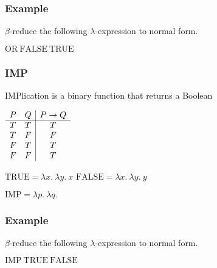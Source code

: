 \documentclass{beamer}
\begin{document}
\begin{frame}
	\frametitle{Example}

	$\beta$-reduce the following $\lambda$-expression to normal form.

	\vspace{0.5cm}

	$\text{OR} \ \text{FALSE} \ \text{TRUE}$

	\vspace{6cm}


\end{frame}

\begin{frame}
	\frametitle{IMP}

	IMPlication is a binary function that returns a Boolean

	\begin{center}
		$\begin{array}{ c c | c }			
			P & Q & P \to Q\\
			\cline{1 - 3}
			T & T & T \\ 
			T & F & F \\ 
			F & T & T \\ 
			F & F & T
		\end{array}$
	\end{center}

	$\text{TRUE} = \lambda x. \ \lambda y. \ x$ \hspace{4cm} $\text{FALSE} = \lambda x. \ \lambda y. \ y$

	\vspace{0.5cm}

	$\text{IMP} = \lambda p. \ \lambda q. \  $

	\vspace{5cm}
	
\end{frame}

\begin{frame}
	\frametitle{Example}

	$\beta$-reduce the following $\lambda$-expression to normal form.

	\vspace{0.5cm}

	$\text{IMP} \ \text{TRUE} \ \text{FALSE}$

	\vspace{6cm}


\end{frame}
\end{document}
